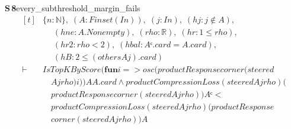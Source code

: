 \documentclass[conference]{IEEEtran}
\theoremstyle{definition}
\newcommand{\lean}[1]{\textsf{\footnotesize #1}}
\begin{document}
\noindent\textbf{S\,8}\quad\lean{every\_subthreshold\_margin\_fails}
{\footnotesize\[ \begin{aligned}[t]
&\{ \mathit{n} : \mathbb{N} \},\; (\mathit{A} : \mathit{Finset} (\mathit{I} \mathit{n})),\; (\mathit{j} : \mathit{I} \mathit{n}),\; (\mathit{hj} : \mathit{j} \notin \mathit{A}),\\
&\quad \; (\mathit{hne} : \mathit{A}.\mathit{Nonempty}),\; (\mathit{rho} : \mathbb{R} ),\; (\mathit{hr} : 1 \leq \mathit{rho}),\\
&\quad \; (\mathit{hr2} : \mathit{rho} < 2),\; (\mathit{hbal} : \mathit{Aᶜ}.\mathit{card}=\mathit{A}.\mathit{card}),\\
&\quad \; (\mathit{hB} : 2 \leq (\mathit{others} \mathit{A} \mathit{j}).\mathit{card})\\
\vdash\;&\mathit{IsTopKByScore} (\mathbf{fun} \mathit{i} => \mathit{osc} (\mathit{productResponse} \mathit{corner} (\mathit{steered}\\
&\quad \mathit{A} \mathit{j} \mathit{rho}) \mathit{i})) \mathit{A} \mathit{A}.\mathit{card} \wedge \mathit{productCompressionLoss} (\mathit{steered} \mathit{A} \mathit{j} \mathit{rho}) (\\
&\quad \mathit{productResponse} \mathit{corner} (\mathit{steered} \mathit{A} \mathit{j} \mathit{rho})) \mathit{Aᶜ} <\\
&\quad \mathit{productCompressionLoss} (\mathit{steered} \mathit{A} \mathit{j} \mathit{rho}) (\mathit{productResponse}\\
&\quad \mathit{corner} (\mathit{steered} \mathit{A} \mathit{j} \mathit{rho})) \mathit{A}
\end{aligned} \]}
\end{document}
